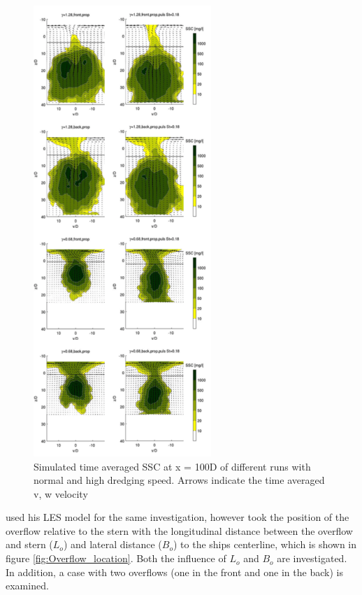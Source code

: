 

\begin{figure}[H]
    \centering
    \includegraphics[width = 0.6\textwidth]{Images/Overflow_position.png}
    \caption{Simulated time averaged SSC at x =  100D of different runs with normal and high dredging speed. Arrows indicate the time averaged v, w velocity}
    \label{fig:Overflow_position}
\end{figure}

\noindent \cite{Decrop} used his LES model for the same investigation, however took the position of the overflow relative to the stern with the longitudinal distance between the overflow and stern ($L_o$) and lateral distance ($B_o$) to the ships centerline, which is shown in figure \ref{fig:Overflow_location}. Both the influence of $L_o$ and $B_o$ are investigated. In addition, a case with two overflows (one in the front and one in the back) is examined.

